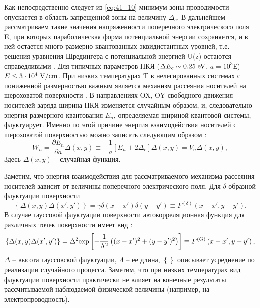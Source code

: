 Как непосредственно следует из \eqref{eq:41_10} минимум зоны проводимости опускается в область запрещенной зоны на величину $\Delta _{c} $. В дальнейшем рассматриваем такие значения напряженности поперечного электрического поля E, при которых параболическая форма потенциальной энергии сохраняется, и в ней остается много размерно-квантованных эквидистантных уровней, т.е. решения уравнения Шредингера с потенциальной энергией U(z) остаются справедливыми \cite{Kanarovskii1995}. Для типичных параметров ПКЯ ($\Delta E_{c} \sim 0.25{\rm \; eV}$, $a=10^{3} $Е) $E\le 3\cdot 10^{4} {\rm \; V/cm}$. При низких температурах T в нелегированных системах с пониженной размерностью важным является механизм рассеяния носителей на шероховатой поверхности \cite{Sakaki1987,Vurgaftman1999}. В направлениях OX, OY свободного движения носителей заряда ширина ПКЯ изменяется случайным образом, и, следовательно энергия размерного квантования $E_{n} $, определяемая шириной квантовой системы, флуктуирует. Именно по этой причине энергия взаимодействия носителей с шероховатой поверхностью можно записать следующим образом \cite{Sakaki1987}:
\begin{equation} \label{eq:41_20}
W_{n} =\frac{\partial E_{n} }{\partial a} \Delta (x,y)\equiv -\frac{1}{a} \left[E_{n} +2\Delta _{c} \right]\Delta (x,y)=V_{n} \Delta (x,y),
\end{equation}
Здесь $\Delta (x,y)$ -- случайная функция.

Заметим, что энергия взаимодействия для рассматриваемого механизма рассеяния носителей зависит от величины поперечного электрического поля. Для $\delta $-образной флуктуации поверхности
\begin{equation} \label{eq:41_30}
\left\{\Delta (x,y)\Delta (x',y')\right\}=\gamma \delta (x-x')\delta (y-y')\equiv F^{(\delta )} \left(x-x',y-y'\right).
\end{equation} 
В случае гауссовой флуктуации поверхности автокорреляционная функция для различных точек поверхности имеет вид \cite{Sakaki1987}:
\begin{equation} \label{eq:41_40}
\left\{\Delta (x,y)\Delta (x',y')\right\}=\Delta ^{2} {\rm exp}\left[-\frac{1}{\Lambda ^{2} } \left((x-x')^{2} +(y-y')^{2} \right)\right]\equiv F^{(G)} \left(x-x',y-y'\right),
\end{equation} 
$\Delta $ -- высота гауссовской флуктуации, $\Lambda $ -- ее длина, $\left\{\right\}$ описывает усреднение по реализации случайного процесса. Заметим, что при низких температурах вид флуктуации поверхности практически не влияет на конечные результаты рассчитываемой наблюдаемой физической величины (например, на электропроводность).

